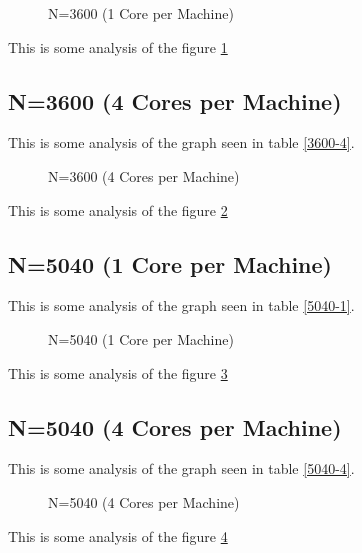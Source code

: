 \documentclass[a4paper]{article}
\begin{document}
\begin{figure}
    
    \caption{N=3600 (1 Core per Machine)}
    \label{fig:3600_1}
\end{figure}

This is some analysis of the figure \ref{fig:3600_1}

\subsection{N=3600 (4 Cores per Machine)}

This is some analysis of the graph seen in table \ref{3600-4}.

\begin{figure}
    
    \caption{N=3600 (4 Cores per Machine)}
    \label{fig:3600_4}
\end{figure}

This is some analysis of the figure \ref{fig:3600_4}

\subsection{N=5040 (1 Core per Machine)}

This is some analysis of the graph seen in table \ref{5040-1}.

\begin{figure}
    
    \caption{N=5040 (1 Core per Machine)}
    \label{fig:5040_1}
\end{figure}

This is some analysis of the figure \ref{fig:5040_1}

\subsection{N=5040 (4 Cores per Machine)}

This is some analysis of the graph seen in table \ref{5040-4}.

\begin{figure}
    
    \caption{N=5040 (4 Cores per Machine)}
    \label{fig:5040_4}
\end{figure}

This is some analysis of the figure \ref{fig:5040_4}
\end{document}
